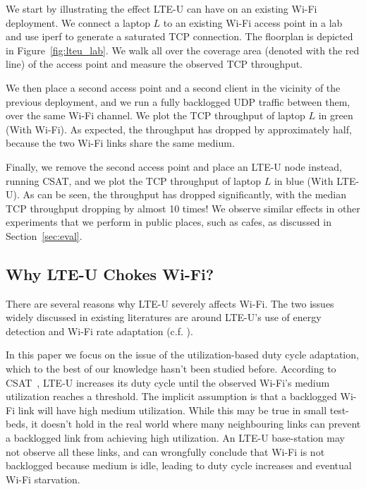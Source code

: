 We start by illustrating the effect LTE-U can have on an existing Wi-Fi deployment. We connect a laptop $L$ to an existing Wi-Fi access point in a lab and use iperf to generate a saturated TCP connection. The floorplan is depicted in Figure~\ref{fig:lteu_lab}. We walk all over the coverage area (denoted with the red line) of the access point and measure the observed TCP throughput. 

We then place a second access point and a second client in the vicinity of the previous deployment, and we run a fully backlogged UDP traffic between them, over the same Wi-Fi channel. We plot the TCP throughput of laptop $L$ in green (With Wi-Fi). As expected, the throughput has dropped by approximately half, because the two Wi-Fi links share the same medium. 

Finally, we remove the second access point and place an LTE-U node instead, running CSAT, and we plot the TCP throughput of laptop $L$ in blue (With LTE-U). As can be seen, the throughput has dropped significantly, with the median TCP throughput dropping by almost 10 times!
We observe similar effects in other experiments that we perform in public places, such as cafes, as discussed in Section~\ref{sec:eval}.



\subsection{Why LTE-U Chokes Wi-Fi?}


There are several reasons why LTE-U severely affects Wi-Fi. The two issues widely discussed in existing literatures are around LTE-U's use of energy detection and Wi-Fi rate adaptation (c.f. \cite{google, cablelabs}). 

In this paper we focus on the issue of the utilization-based duty cycle adaptation, which to the best of our knowledge hasn't been studied before. 
According to CSAT~\cite{lteuforum_csat}, LTE-U increases its duty cycle until the observed Wi-Fi's medium utilization reaches a threshold. 
The implicit assumption is that a backlogged Wi-Fi link will have high medium utilization. While this may be true in small test-beds, it doesn't hold in the real world where many neighbouring links can prevent a backlogged link from achieving high utilization. An LTE-U base-station may not observe all these links, and can wrongfully conclude that Wi-Fi is not backlogged because medium is idle, leading to duty cycle increases and eventual Wi-Fi starvation.



